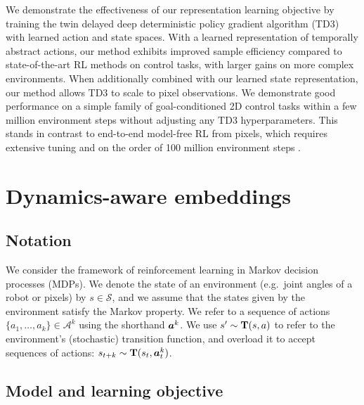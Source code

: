 We demonstrate the effectiveness of our representation learning objective by training the twin delayed deep deterministic policy gradient algorithm (TD3) \citep{fujimoto2018addressing} with learned action and state spaces.
With a learned representation of temporally abstract actions, our method exhibits improved sample efficiency compared to state-of-the-art RL methods on control tasks, with larger gains on more complex environments.
When additionally combined with our learned state representation, our method allows TD3 to scale to pixel observations.
We demonstrate good performance on a simple family of goal-conditioned 2D control tasks within a few million environment steps without adjusting any TD3 hyperparameters.
This stands in contrast to end-to-end model-free RL from pixels, which requires extensive tuning \citep{lillicrap2015continuous} and on the order of 100 million environment steps \citep{barth2018distributed}.





\section{Dynamics-aware embeddings}

\subsection{Notation}

We consider the framework of reinforcement learning in Markov decision processes (MDPs).
We denote the state of an environment (e.g.\ joint angles of a robot or pixels) by $s \in \mathcal{S}$, and we assume that the states given by the environment satisfy the Markov property.
We refer to a sequence of actions $\{ a_1, \ldots, a_k \} \in \mathcal{A}^k$ using the shorthand ${\bm{a}}^k$.
We use $s' \sim \mathbf{T}(s, a)$ to refer to the environment's (stochastic) transition function, and overload it to accept sequences of actions: $s_{t+k} \sim \mathbf{T}(s_t, {\bm{a}}^k_t)$.


\subsection{Model and learning objective}


